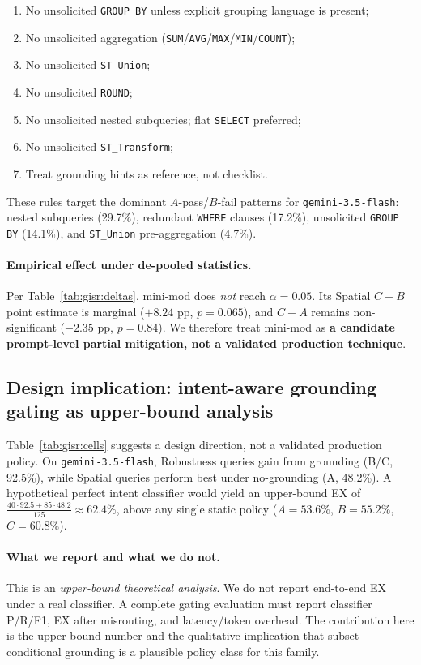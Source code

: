 \begin{enumerate}[itemsep=2pt,leftmargin=*]
\item No unsolicited \texttt{GROUP BY} unless explicit grouping language is present;
\item No unsolicited aggregation (\texttt{SUM}/\texttt{AVG}/\texttt{MAX}/\texttt{MIN}/\texttt{COUNT});
\item No unsolicited \texttt{ST\_Union};
\item No unsolicited \texttt{ROUND};
\item No unsolicited nested subqueries; flat \texttt{SELECT} preferred;
\item No unsolicited \texttt{ST\_Transform};
\item Treat grounding hints as reference, not checklist.
\end{enumerate}

These rules target the dominant $A$-pass/$B$-fail patterns for \texttt{gemini-3.5-flash}: nested subqueries (29.7\%), redundant \texttt{WHERE} clauses (17.2\%), unsolicited \texttt{GROUP BY} (14.1\%), and \texttt{ST\_Union} pre-aggregation (4.7\%).

\paragraph{Empirical effect under de-pooled statistics.} Per Table~\ref{tab:gisr:deltas}, mini-mod does \emph{not} reach $\alpha{=}0.05$. Its Spatial $C-B$ point estimate is marginal ($+8.24$ pp, $p{=}0.065$), and $C-A$ remains non-significant ($-2.35$ pp, $p{=}0.84$). We therefore treat mini-mod as \textbf{a candidate prompt-level partial mitigation, not a validated production technique}.

\subsection{Design implication: intent-aware grounding gating as upper-bound analysis}
\label{sec:gisr:routing}

Table~\ref{tab:gisr:cells} suggests a design direction, not a validated production policy. On \texttt{gemini-3.5-flash}, Robustness queries gain from grounding (B/C, 92.5\%), while Spatial queries perform best under no-grounding (A, 48.2\%). A hypothetical perfect intent classifier would yield an upper-bound EX of $\frac{40 \cdot 92.5 + 85 \cdot 48.2}{125} \approx 62.4\%$, above any single static policy ($A{=}53.6\%$, $B{=}55.2\%$, $C{=}60.8\%$).

\paragraph{What we report and what we do not.} This is an \emph{upper-bound theoretical analysis}. We do not report end-to-end EX under a real classifier. A complete gating evaluation must report classifier P/R/F1, EX after misrouting, and latency/token overhead. The contribution here is the upper-bound number and the qualitative implication that subset-conditional grounding is a plausible policy class for this family.

